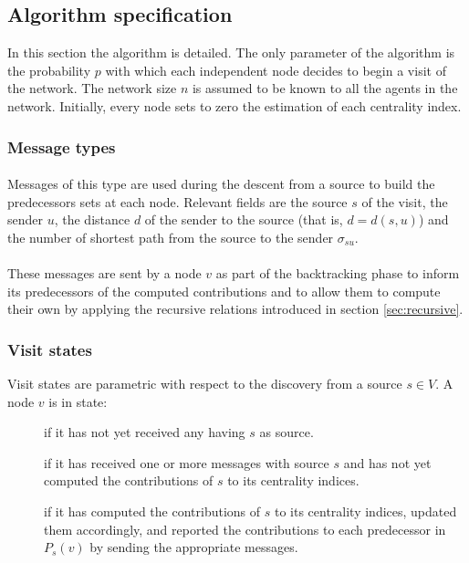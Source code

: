\subsection{Algorithm specification}

In this section the algorithm is detailed. The only parameter of the algorithm is the probability $p$ with which each independent node decides to begin a visit of the network. The network size $n$ is assumed to be known to all the agents in the network. Initially, every node sets to zero the estimation of each centrality index.

\subsubsection{Message types}

\paragraph{} Messages of this type are used during the descent from a source to build the predecessors sets at each node. Relevant fields are the source $s$ of the visit, the sender $u$, the distance $d$ of the sender to the source (that is, $d = d(s,u)$) and the number of shortest path from the source to the sender $\sigma_{su}$.

\paragraph{} These messages are sent by a node $v$ as part of the backtracking phase to inform its predecessors of the computed contributions and to allow them to compute their own by applying the recursive relations introduced in section \ref{sec:recursive}.

\subsubsection{Visit states}

Visit states are parametric with respect to the discovery from a source $s \in V$. A node $v$ is in state:
\begin{description}
\item[] if it has not yet received any \mdisc{} having $s$ as source.
\item[] if it has received one or more \mdisc{} messages with source $s$ and has not yet computed the contributions of $s$ to its centrality indices.
\item[] if it has computed the contributions of $s$ to its centrality indices, updated them accordingly, and reported the contributions to each predecessor in $P_s(v)$ by sending the appropriate \mrep{} messages.
\end{description}

